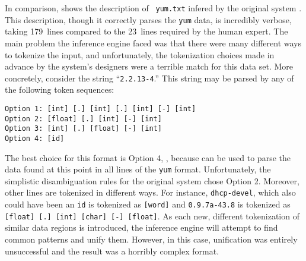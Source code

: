 In comparison,  shows the description of {\tt
  yum.txt} infered by the original \learnpads{} system
\cite{fisher+:dirttoshovels,fisher+:sigmod08}.  This description,
though it correctly parses the \texttt{yum} data, is incredibly
verbose, taking 179~lines compared to the 23~lines required by the 
human expert.  The main problem the inference engine faced was that there were
many different ways to tokenize the input, and unfortunately, 
the tokenization choices
made in advance by the system's designers were a terrible match 
for this data set.  More concretely, consider 
the string ``{\tt 2.2.13-4}.'' This string may be parsed by 
any of the following token sequences: {\small
\begin{verbatim}
Option 1: [int] [.] [int] [.] [int] [-] [int]
Option 2: [float] [.] [int] [-] [int]
Option 3: [int] [.] [float] [-] [int]
Option 4: [id]
\end{verbatim}
}\normalsize
The best choice for this format is Option 4, ,
because  can be used to parse the data found at this point in
all lines of the {\tt yum} format.  Unfortunately, the simplistic 
disambiguation rules for the original system chose Option 2.  Moreover,
other lines are tokenized in different ways.
For instance, {\tt dhcp-devel}, which also could have been an {\tt id}
is tokenized as {\tt [word]} and 
{\tt 0.9.7a-43.8} is tokenized as
{\tt [float] [.] [int] [char] [-] [float]}.  As each new, different
tokenization of similar data regions is introduced, the inference
engine will attempt to find common patterns and unify them.  However,
in this case, unification was entirely unsuccessful and the
result was a horribly complex format.
  


